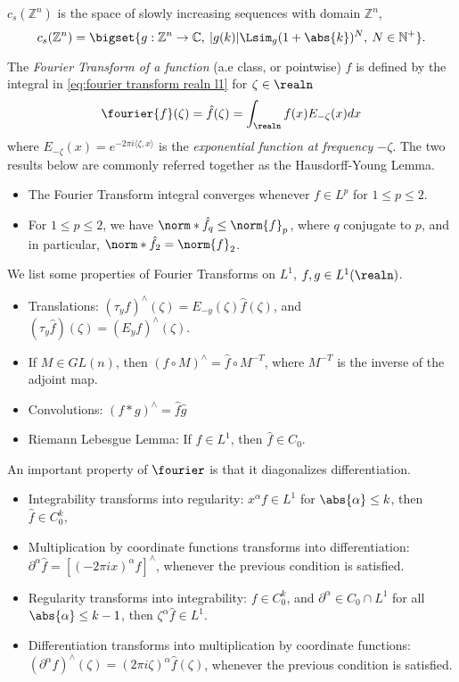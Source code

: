 \documentclass[../main-v2-manifolds.tex]{subfiles}
\begin{document}
\begin{definition}
    $c_s(\mathbb{Z}^n)$ is the space of slowly increasing sequences with domain $\mathbb{Z}^n$,
    \[
    c_s(\mathbb{Z}^n) = \bigset{g: \mathbb{Z}^n\to\mathbb{C},\: \vert g(k)\vert\Lsim_{g}(1+\abs{k})^{N},\:N\in\mathbb{N}^+}.
    \]
\end{definition}
The \emph{Fourier Transform of a function} (a.e class, or pointwise) $f$ is defined by the integral in \cref{eq:fourier transform realn l1} for $\zeta\in\realn$
\begin{equation}
    \fourier{f}(\zeta)= \hat{f}(\zeta) = \int_{\realn} f(x)E_{-\zeta}(x)dx
    \label{eq:fourier transform realn l1}
\end{equation}
where $E_{-\zeta}(x) = e^{-2\pi i \langle \zeta, x\rangle}$ is the \emph{exponential function at frequency $-\zeta$}. The two results below are commonly referred together as the Hausdorff-Young Lemma.
\begin{itemize}
    \item The Fourier Transform integral converges whenever $f\in L^p$ for $1\leq p \leq 2$. 
    \item For $1\leq p\leq 2$, we have $\norm*{\hat{f}}_{q}\leq \norm{f}_p$, where $q$ conjugate to $p$, and in particular, $\norm*{\hat{f}}_2 = \norm{f}_{2}$.
\end{itemize}
We list some properties of Fourier Transforms on $L^1$, $f,g\in L^1(\realn)$.
\begin{itemize}
    \item Translations: $(\tau_y f)^\wedge(\zeta) = E_{-y}(\zeta)\hat{f}(\zeta)$, and $(\tau_{y}\hat{f})(\zeta) = (E_{y}f)^{\wedge}(\zeta)$.
    \item If $M\in GL(n)$, then $(f\circ M)^{\wedge} = \hat{f}\circ M^{-T}$, where $M^{-T}$ is the inverse of the adjoint map.
    \item Convolutions: $(f\ast g)^{\wedge} = \hat{f}\hat{g}$
    \item Riemann Lebesgue Lemma: If $f\in L^1$, then $\hat{f}\in C_0$.
\end{itemize}
An important property of $\fourier$ is that it diagonalizes differentiation.
\begin{itemize}
    \item Integrability transforms into regularity: $x^{\alpha}f\in L^1$ for $\abs{\alpha}\leq k$, then $\hat{f}\in C_0^k$,
    \item Multiplication by coordinate functions transforms into differentiation: $\partial^\alpha\hat{f} = [(-2\pi i x)^{\alpha}f]^{\wedge}$, whenever the previous condition is satisfied.
    \item Regularity transforms into integrability: $f\in C_0^k$, and $\partial^\alpha\in C_0\cap L^1$ for all $\abs{\alpha}\leq k-1$, then $\zeta^\alpha\hat{f}\in L^1$.
    \item Differentiation transforms into multiplication by coordinate functions: $(\partial^\alpha f)^\wedge(\zeta) = (2\pi i \zeta)^{\alpha}\hat{f}(\zeta)$, whenever the previous condition is satisfied.
\end{itemize}
\end{document}
